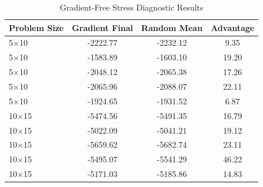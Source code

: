 \begin{table}[htbp]
\centering
\caption{Gradient-Free Stress Diagnostic Results}
\label{tab:stress_diagnostic}
\begin{tabular}{lccc}
\toprule
\textbf{Problem Size} & \textbf{Gradient Final} & \textbf{Random Mean} & \textbf{Advantage} \\
\midrule
5×10 & -2222.77 & -2232.12 & 9.35 \\
5×10 & -1583.89 & -1603.10 & 19.20 \\
5×10 & -2048.12 & -2065.38 & 17.26 \\
5×10 & -2065.96 & -2088.07 & 22.11 \\
5×10 & -1924.65 & -1931.52 & 6.87 \\
10×15 & -5474.56 & -5491.35 & 16.79 \\
10×15 & -5022.09 & -5041.21 & 19.12 \\
10×15 & -5659.62 & -5682.74 & 23.11 \\
10×15 & -5495.07 & -5541.29 & 46.22 \\
10×15 & -5171.03 & -5185.86 & 14.83 \\
\bottomrule
\end{tabular}
\end{table}
